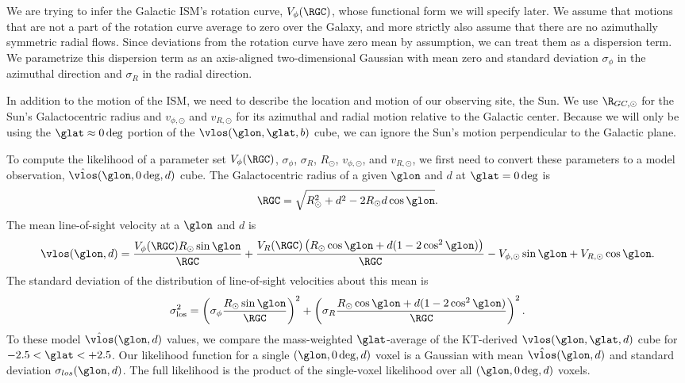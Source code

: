 We are trying to infer the Galactic ISM's rotation curve, $V_\phi (\RGC)$, whose functional form we will specify later. 
We assume that motions that are not a part of the rotation curve average to zero over the Galaxy, and more strictly also assume that there are no azimuthally symmetric radial flows.
Since deviations from the rotation curve have zero mean by assumption, we can treat them as a dispersion term.
We parametrize this dispersion term as an axis-aligned two-dimensional Gaussian with mean zero and standard deviation $\sigma_\phi$ in the azimuthal direction and $\sigma_R$ in the radial direction.

In addition to the motion of the ISM, we need to describe the location and motion of our observing site, the Sun. 
We use $\R_{GC, \odot}$ for the Sun's Galactocentric radius and $v_{\phi, \odot}$ and $v_{R, \odot}$ for its azimuthal and radial motion relative to the Galactic center. 
Because we will only be using the $\glat \approx 0 \deg$ portion of the $\vlos(\glon, \glat, b)$ cube, we can ignore the Sun's motion perpendicular to the Galactic plane.

To compute the likelihood of a parameter set $V_\phi (\RGC)$, $\sigma_\phi$, $\sigma_R$, $R_{\odot}$, $v_{\phi, \odot}$, and $v_{R, \odot}$, we first need to convert these parameters to a model observation, $\hat{\vlos}(\glon, 0\deg, d)$ cube. 
The Galactocentric radius of a given $\glon$ and $d$ at $\glat = 0 \deg$ is 
\begin{equation}
\RGC = \sqrt{R^2_\odot + d^2 - 2 R_\odot d \cos \glon}.
\end{equation}
The mean line-of-sight velocity at a $\glon$ and $d$ is
\begin{equation}
\label{eqn:vlos_mean}
\vlos(\glon, d) = \frac{V_\phi (\RGC) R_\odot \sin\glon}{\RGC} + 
\frac{V_R (\RGC) \left(R_\odot \cos \glon + d (1 - 2 \cos^2 \glon)  \right) }{\RGC} - V_{\phi, \odot} \sin \glon + V_{R, \odot} \cos \glon.
\end{equation}
The standard deviation of the distribution of line-of-sight velocities about this mean is 
\begin{equation}
\label{eqn:vlos_var}
\sigma^2_\mathrm{los} = \left(\sigma_\phi \frac{R_\odot \sin \glon}{\RGC} \right)^2 + 
\left(\sigma_R  \frac{R_\odot \cos \glon + d (1 - 2 \cos^2 \glon)}{\RGC} \right)^2.
\end{equation}
To these model $\hat{\vlos}(\glon, d)$ values, we compare the mass-weighted $\glat$-average of the KT-derived $\vlos(\glon, \glat, d)$ cube for $-2.5 < \glat < + 2.5$. 
Our likelihood function for a single $(\glon, 0\deg, d)$ voxel is a Gaussian with mean $\hat{\vlos}(\glon, d)$ and standard deviation $\sigma_{los}(\glon, d)$.
The full likelihood is the product of the single-voxel likelihood over all $(\glon, 0\deg, d)$ voxels.

